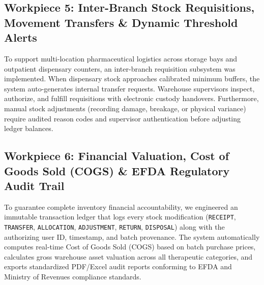 \subsection{Workpiece 5: Inter-Branch Stock Requisitions, Movement Transfers \& Dynamic Threshold Alerts}
To support multi-location pharmaceutical logistics across storage bays and outpatient dispensary counters, an inter-branch requisition subsystem was implemented. When dispensary stock approaches calibrated minimum buffers, the system auto-generates internal transfer requests. Warehouse supervisors inspect, authorize, and fulfill requisitions with electronic custody handovers. Furthermore, manual stock adjustments (recording damage, breakage, or physical variance) require audited reason codes and supervisor authentication before adjusting ledger balances.

\subsection{Workpiece 6: Financial Valuation, Cost of Goods Sold (COGS) \& EFDA Regulatory Audit Trail}
To guarantee complete inventory financial accountability, we engineered an immutable transaction ledger that logs every stock modification (\texttt{RECEIPT}, \texttt{TRANSFER}, \texttt{ALLOCATION}, \texttt{ADJUSTMENT}, \texttt{RETURN}, \texttt{DISPOSAL}) along with the authorizing user ID, timestamp, and batch provenance. The system automatically computes real-time Cost of Goods Sold (COGS) based on batch purchase prices, calculates gross warehouse asset valuation across all therapeutic categories, and exports standardized PDF/Excel audit reports conforming to EFDA and Ministry of Revenues compliance standards.

